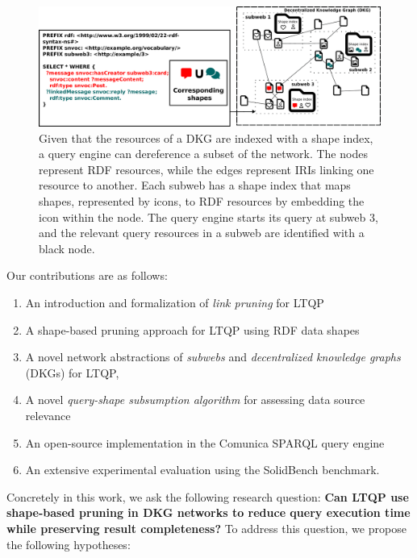 \begin{figure}
    \centering
    \includegraphics[width=1.0\linewidth]{figure/dkg.pdf}
    \caption{
    Given that the resources of a DKG are indexed with a shape index, a query engine can dereference a subset of the network.
    The nodes represent RDF resources, while the edges represent IRIs linking one resource to another.
    Each subweb has a shape index that maps shapes, represented by icons, to RDF resources by embedding the icon within the node.
    The query engine starts its query at subweb 3, and the relevant query resources in a subweb are identified with a black node.
    }
    \label{fig:dkg}
\end{figure}

Our contributions are as follows:
\begin{enumerate}[label=(\roman*)]
    \item An introduction and formalization of \emph{link pruning} for LTQP 
    \item A shape-based pruning approach for LTQP using RDF data shapes
    \item A novel network abstractions of \emph{subwebs} and \emph{decentralized knowledge graphs} (DKGs) for LTQP,
    \item A novel \emph{query-shape subsumption algorithm} for assessing data source relevance
    \item An open-source implementation in the Comunica SPARQL query engine~\cite{taelman_iswc_resources_comunica_2018}
    \item An extensive experimental evaluation using the SolidBench benchmark.
\end{enumerate}

Concretely in this work, we ask the following research question: 
\textbf{Can LTQP use shape-based pruning in DKG networks to reduce query execution time while preserving result completeness?}
To address this question, we propose the following hypotheses:  

